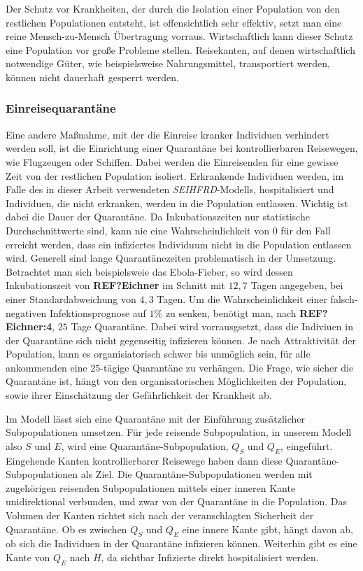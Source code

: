 Der Schutz vor Krankheiten, der durch die Isolation einer Population von den restlichen Populationen entsteht, ist offensichtlich sehr effektiv, setzt man eine reine Mensch-zu-Mensch Übertragung vorraus. Wirtschaftlich kann dieser Schutz eine Population vor große Probleme stellen. Reisekanten, auf denen wirtschaftlich notwendige Güter, wie beispielsweise Nahrungsmittel, transportiert werden, können nicht dauerhaft gesperrt werden. 

\subsubsection{Einreisequarantäne}
Eine andere Maßnahme, mit der die Einreise kranker Individuen verhindert werden soll, ist die Einrichtung einer Quarantäne bei kontrollierbaren Reisewegen, wie Flugzeugen oder Schiffen. Dabei werden die Einreisenden für eine gewisse Zeit von der restlichen Population isoliert. Erkrankende Individuen werden, im Falle des in dieser Arbeit verwendeten \emph{SEIHFRD}-Modells, hospitalisiert und Individuen, die nicht erkranken, werden in die Population entlassen. Wichtig ist dabei die Dauer der Quarantäne. Da Inkubationszeiten nur statistische Durchschnittwerte sind, kann nie eine Wahrscheinlichkeit von 0 für den Fall erreicht werden, dass ein infiziertes Individuum nicht in die Population entlassen wird. Generell sind lange Quarantänezeiten problematisch in der Umsetzung. Betrachtet man sich beispielsweie das Ebola-Fieber, so wird dessen Inkubationszeit von \textbf{REF?Eichner} im Schnitt mit $12,7$ Tagen angegeben, bei einer Standardabweichung von $4,3$ Tagen. Um die Wahrscheinlichkeit einer falsch-negativen Infektionsprognose auf $1\%$ zu senken, benötigt man, nach \textbf{REF?Eichner:4}, $25$ Tage Quarantäne. Dabei wird vorrausgsetzt, dass die Indiviuen in der Quarantäne sich nicht gegenseitig infizieren können. Je nach Attraktivität der Population, kann es organisiatorisch schwer bis unmöglich sein, für alle ankommenden eine $25$-tägige Quarantäne zu verhängen. Die Frage, wie sicher die Quarantäne ist, hängt von den organisatorischen Möglichkeiten der Population, sowie ihrer Einschätzung der Gefährlichkeit der Krankheit ab. 

Im Modell lässt sich eine Quarantäne mit der Einführung zusätzlicher Subpopulationen umsetzen. Für jede reisende Subpopulation, in unserem Modell also $S$ und $E$, wird eine Quarantäne-Subpopulation, $Q_S$ und $Q_E$, eingeführt. Eingehende Kanten kontrollierbarer Reisewege haben dann diese Quarantäne-Subpopulationen als Ziel. Die Quarantäne-Subpopulationen werden mit zugehörigen reisenden Subpopulationen mittels einer inneren Kante unidirektional verbunden, und zwar von der Quarantäne in die Population. Das Volumen der Kanten richtet sich nach der veranschlagten Sicherheit der Quarantäne. Ob es zwischen $Q_S$ und $Q_E$ eine innere Kante gibt, hängt davon ab, ob sich die Individuen in der Quarantäne infizieren können. Weiterhin gibt es eine Kante von $Q_E$ nach $H$, da sichtbar Infizierte direkt hospitalisiert werden. 

